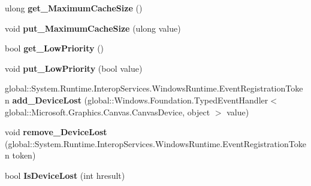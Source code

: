 \begin{DoxyCompactItemize}
\item 
\mbox{\label{interface_microsoft_1_1_graphics_1_1_canvas_1_1_i_canvas_device_a4004fcfc71e1035a4e3e56590d32a11a}} 
ulong {\bfseries get\+\_\+\+Maximum\+Cache\+Size} ()
\item 
\mbox{\label{interface_microsoft_1_1_graphics_1_1_canvas_1_1_i_canvas_device_a3812c813e00bdc30b376b38962b40ba7}} 
void {\bfseries put\+\_\+\+Maximum\+Cache\+Size} (ulong value)
\item 
\mbox{\label{interface_microsoft_1_1_graphics_1_1_canvas_1_1_i_canvas_device_a8e974c9c2295757c25f1c270c662d0df}} 
bool {\bfseries get\+\_\+\+Low\+Priority} ()
\item 
\mbox{\label{interface_microsoft_1_1_graphics_1_1_canvas_1_1_i_canvas_device_a82a3e875104020e0b8e886b72df60554}} 
void {\bfseries put\+\_\+\+Low\+Priority} (bool value)
\item 
\mbox{\label{interface_microsoft_1_1_graphics_1_1_canvas_1_1_i_canvas_device_a883498a6511789a253e054e8db8972ac}} 
global\+::\+System.\+Runtime.\+Interop\+Services.\+Windows\+Runtime.\+Event\+Registration\+Token {\bfseries add\+\_\+\+Device\+Lost} (global\+::\+Windows.\+Foundation.\+Typed\+Event\+Handler$<$ global\+::\+Microsoft.\+Graphics.\+Canvas.\+Canvas\+Device, object $>$ value)
\item 
\mbox{\label{interface_microsoft_1_1_graphics_1_1_canvas_1_1_i_canvas_device_a4423eb62fed2e41b1e8429993ad3b1f1}} 
void {\bfseries remove\+\_\+\+Device\+Lost} (global\+::\+System.\+Runtime.\+Interop\+Services.\+Windows\+Runtime.\+Event\+Registration\+Token token)
\item 
\mbox{\label{interface_microsoft_1_1_graphics_1_1_canvas_1_1_i_canvas_device_adb664badebd02d30b2beead4a270a634}} 
bool {\bfseries Is\+Device\+Lost} (int hresult)
\item 

\end{DoxyCompactItemize}
